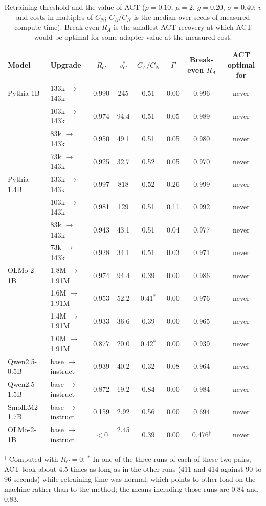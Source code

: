 \documentclass[ijds,nonblindrev]{informs4}
\begin{document}
\begin{table}[t]
\centering
\caption{Retraining threshold and the value of ACT ($\rho=0.10$, $\mu=2$, $g=0.20$, $\sigma=0.40$; $v$ and costs in multiples of $C_N$; $C_A/C_N$ is the median over seeds of measured compute time). Break-even $R_A$ is the smallest ACT recovery at which ACT would be optimal for some adapter value at the measured cost.}\label{tab:policy}
\small
\begin{tabular}{llcccccc}
\toprule
Model & Upgrade & $R_C$ & $v^*_C$ & $C_A/C_N$ & $\Gamma$ & Break-even $R_A$ & ACT optimal for\\
\midrule
Pythia-1B & 133k $\to$ 143k & 0.990 & 245 & 0.51 & 0.00 & 0.996 & never\\
 & 103k $\to$ 143k & 0.974 & 94.4 & 0.51 & 0.05 & 0.989 & never\\
 & 83k $\to$ 143k & 0.950 & 49.1 & 0.51 & 0.05 & 0.980 & never\\
 & 73k $\to$ 143k & 0.925 & 32.7 & 0.52 & 0.05 & 0.970 & never\\
Pythia-1.4B & 133k $\to$ 143k & 0.997 & 818 & 0.52 & 0.26 & 0.999 & never\\
 & 103k $\to$ 143k & 0.981 & 129 & 0.51 & 0.11 & 0.992 & never\\
 & 83k $\to$ 143k & 0.943 & 43.1 & 0.51 & 0.04 & 0.977 & never\\
 & 73k $\to$ 143k & 0.928 & 34.1 & 0.51 & 0.03 & 0.971 & never\\
OLMo-2-1B & 1.8M $\to$ 1.91M & 0.974 & 94.4 & 0.39 & 0.00 & 0.986 & never\\
 & 1.6M $\to$ 1.91M & 0.953 & 52.2 & 0.41$^\ast$ & 0.00 & 0.976 & never\\
 & 1.4M $\to$ 1.91M & 0.933 & 36.6 & 0.39 & 0.00 & 0.965 & never\\
 & 1.0M $\to$ 1.91M & 0.877 & 20.0 & 0.42$^\ast$ & 0.00 & 0.939 & never\\
Qwen2.5-0.5B & base $\to$ instruct & 0.939 & 40.2 & 0.32 & 0.08 & 0.964 & never\\
Qwen2.5-1.5B & base $\to$ instruct & 0.872 & 19.2 & 0.84 & 0.00 & 0.984 & never\\
SmolLM2-1.7B & base $\to$ instruct & 0.159 & 2.92 & 0.56 & 0.00 & 0.694 & never\\
OLMo-2-1B & base $\to$ instruct & $<0$ & 2.45$^\dagger$ & 0.39 & 0.00 & 0.476$^\dagger$ & never\\
\bottomrule
\end{tabular}

\smallskip\footnotesize $^\dagger$ Computed with $R_C=0$. $^\ast$ In one of the three runs of each of these two pairs, ACT took about 4.5 times as long as in the other runs (411 and 414 against 90 to 96 seconds) while retraining time was normal, which points to other load on the machine rather than to the method; the means including those runs are 0.84 and 0.83.
\end{table}
\end{document}
